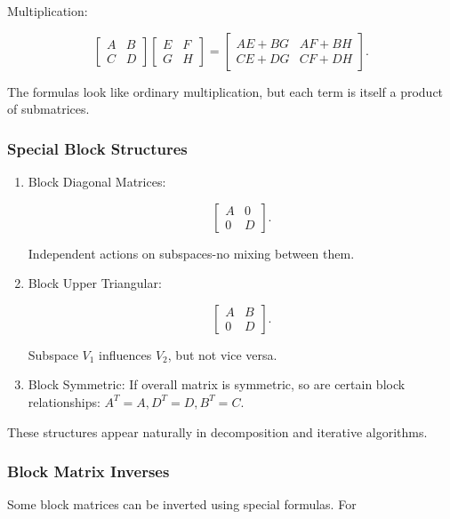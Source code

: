 \documentclass[
  letterpaper,
  DIV=11,
  numbers=noendperiod]{scrreprt}
\begin{document}
Multiplication:

\[
\begin{bmatrix} A & B \\ C & D \end{bmatrix}
\begin{bmatrix} E & F \\ G & H \end{bmatrix} =
\begin{bmatrix} AE+BG & AF+BH \\ CE+DG & CF+DH \end{bmatrix}.
\]

The formulas look like ordinary multiplication, but each term is itself
a product of submatrices.

\subsubsection{Special Block Structures}\label{special-block-structures}

\begin{enumerate}
\def\labelenumi{\arabic{enumi}.}
\item
  Block Diagonal Matrices:

  \[
  \begin{bmatrix} A & 0 \\ 0 & D \end{bmatrix}.
  \]

  Independent actions on subspaces-no mixing between them.
\item
  Block Upper Triangular:

  \[
  \begin{bmatrix} A & B \\ 0 & D \end{bmatrix}.
  \]

  Subspace \(V_1\) influences \(V_2\), but not vice versa.
\item
  Block Symmetric: If overall matrix is symmetric, so are certain block
  relationships: \(A^T=A, D^T=D, B^T=C\).
\end{enumerate}

These structures appear naturally in decomposition and iterative
algorithms.

\subsubsection{Block Matrix Inverses}\label{block-matrix-inverses}

Some block matrices can be inverted using special formulas. For
\end{document}
